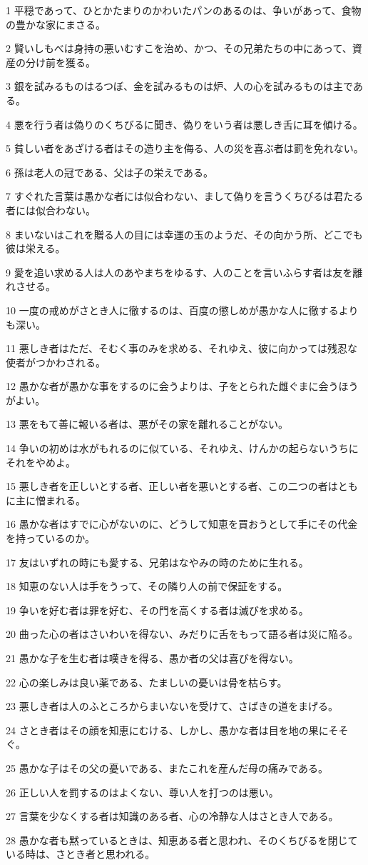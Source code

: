 \par 1 平穏であって、ひとかたまりのかわいたパンのあるのは、争いがあって、食物の豊かな家にまさる。
\par 2 賢いしもべは身持の悪いむすこを治め、かつ、その兄弟たちの中にあって、資産の分け前を獲る。
\par 3 銀を試みるものはるつぼ、金を試みるものは炉、人の心を試みるものは主である。
\par 4 悪を行う者は偽りのくちびるに聞き、偽りをいう者は悪しき舌に耳を傾ける。
\par 5 貧しい者をあざける者はその造り主を侮る、人の災を喜ぶ者は罰を免れない。
\par 6 孫は老人の冠である、父は子の栄えである。
\par 7 すぐれた言葉は愚かな者には似合わない、まして偽りを言うくちびるは君たる者には似合わない。
\par 8 まいないはこれを贈る人の目には幸運の玉のようだ、その向かう所、どこでも彼は栄える。
\par 9 愛を追い求める人は人のあやまちをゆるす、人のことを言いふらす者は友を離れさせる。
\par 10 一度の戒めがさとき人に徹するのは、百度の懲しめが愚かな人に徹するよりも深い。
\par 11 悪しき者はただ、そむく事のみを求める、それゆえ、彼に向かっては残忍な使者がつかわされる。
\par 12 愚かな者が愚かな事をするのに会うよりは、子をとられた雌ぐまに会うほうがよい。
\par 13 悪をもて善に報いる者は、悪がその家を離れることがない。
\par 14 争いの初めは水がもれるのに似ている、それゆえ、けんかの起らないうちにそれをやめよ。
\par 15 悪しき者を正しいとする者、正しい者を悪いとする者、この二つの者はともに主に憎まれる。
\par 16 愚かな者はすでに心がないのに、どうして知恵を買おうとして手にその代金を持っているのか。
\par 17 友はいずれの時にも愛する、兄弟はなやみの時のために生れる。
\par 18 知恵のない人は手をうって、その隣り人の前で保証をする。
\par 19 争いを好む者は罪を好む、その門を高くする者は滅びを求める。
\par 20 曲った心の者はさいわいを得ない、みだりに舌をもって語る者は災に陥る。
\par 21 愚かな子を生む者は嘆きを得る、愚か者の父は喜びを得ない。
\par 22 心の楽しみは良い薬である、たましいの憂いは骨を枯らす。
\par 23 悪しき者は人のふところからまいないを受けて、さばきの道をまげる。
\par 24 さとき者はその顔を知恵にむける、しかし、愚かな者は目を地の果にそそぐ。
\par 25 愚かな子はその父の憂いである、またこれを産んだ母の痛みである。
\par 26 正しい人を罰するのはよくない、尊い人を打つのは悪い。
\par 27 言葉を少なくする者は知識のある者、心の冷静な人はさとき人である。
\par 28 愚かな者も黙っているときは、知恵ある者と思われ、そのくちびるを閉じている時は、さとき者と思われる。

